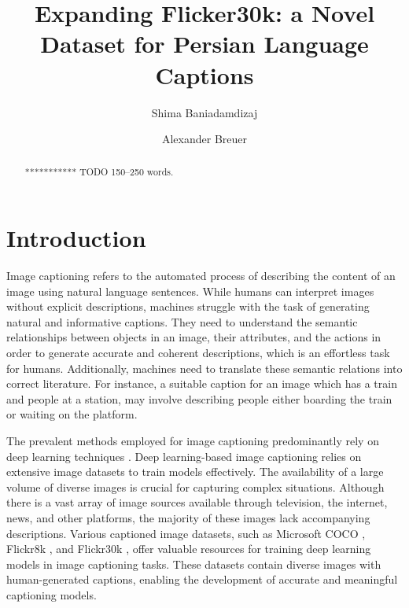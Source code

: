 \documentclass[runningheads]{llncs}
\begin{document}
%
\title{Expanding Flicker30k: a Novel Dataset for Persian Language Captions}
%
%
\author{Shima Baniadamdizaj \and
Alexander Breuer }
%
% 
%
\maketitle              %
%
\begin{abstract}
*********** TODO
150--250 words.

\end{abstract}
%
%
%
\section{Introduction}
Image captioning refers to the automated process of describing the content of an image using natural language sentences. While humans can interpret images without explicit descriptions, machines struggle with the task of generating natural and informative captions. They need to understand the semantic relationships between objects in an image, their attributes, and the actions in order to generate accurate and coherent descriptions, which is an effortless task for humans. Additionally, machines need to translate these semantic relations into correct literature. For instance, a suitable caption for an image which has a train and people at a station, may involve describing people either boarding the train or waiting on the platform.

The prevalent methods employed for image captioning predominantly rely on deep learning techniques \cite{Karpathy2015,Vinyals2015,Xu2015,Luo2023}. Deep learning-based image captioning relies on extensive image datasets to train models effectively. The availability of a large volume of diverse images is crucial for capturing complex situations. Although there is a vast array of image sources available through television, the internet, news, and other platforms, the majority of these images lack accompanying descriptions. Various captioned image datasets, such as Microsoft COCO \cite{MSCOCO}, Flickr8k \cite{Flickr8k}, and Flickr30k \cite{Flickr30k}, offer valuable resources for training deep learning models in image captioning tasks. These datasets contain diverse images with human-generated captions, enabling the development of accurate and meaningful captioning models.
\end{document}
